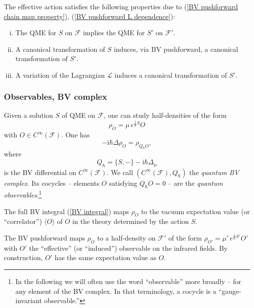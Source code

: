 \documentclass{amsart}
\theoremstyle{plain} %
\theoremstyle{definition}
\theoremstyle{remark}
\newcommand{\F}{\mathcal{F}}
\newcommand{\LL}{\mathcal{L}}
\newcommand{\iii}{\mathrm{i}}
\begin{document}
The effective action satisfies the following properties due to (\ref{BV pushforward chain map property}), (\ref{BV pushforward L dependence}):
\begin{enumerate}[(i)]
    \item The QME for $S$ on $\F$ implies the QME for $S'$ on $\F'$.
    \item A canonical transformation of $S$ induces, via BV pushforward, a canonical transformation of $S'$.
    \item A variation of the Lagrangian $\LL$ induces a canonical transformation of $S'$.
\end{enumerate}


\subsubsection{Observables, BV complex}\label{sss: observables, BV complex}
Given a solution $S$ of QME on $\F$, one can study half-densities of the form
\begin{equation}
    \rho_O=\mu\, e^{\frac{\iii}{\hbar}S} O
\end{equation}
with $O\in C^\infty(\F)$. One has
\begin{equation}
    -\iii\hbar\Delta \rho_O= \rho_{Q_\hbar O},
\end{equation}
where
\begin{equation}
    Q_\hbar=\{S,-\}-\iii\hbar \Delta_\mu
\end{equation}
is the BV differential on $C^\infty(\F)$. We call $(C^\infty(\F),Q_\hbar)$ the \emph{quantum BV complex}. 
Its cocycles -- elements $O$ satisfying $Q_\hbar O=0$ -- are the \emph{quantum observables}.\footnote{In the following we will often use the word ``observable'' more broadly -- for any element of the BV complex. In that terminology, a cocycle is a ``gauge-invariant observable.''}

The full BV integral (\ref{BV integral}) maps $\rho_O$ to the vacuum expectation value (or ``correlator'') $\langle O \rangle$ of $O$ in the theory determined by the action $S$.

The BV pushforward maps $\rho_O$ to a half-density on $\F'$ of the form $\rho_{O'}=\mu'\, e^{\frac{\iii}{\hbar}S'}O'$ with $O'$ the ``effective'' (or ``induced'') observable on the infrared fields. By construction, $O'$ has the same expectation value as $O$. 
\end{document}
